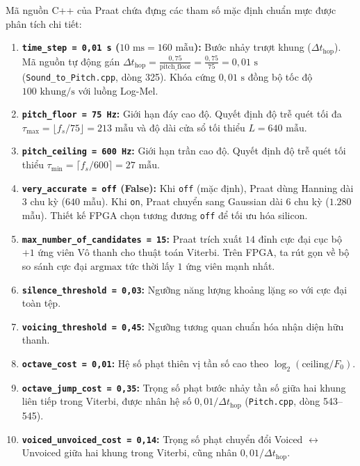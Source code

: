 \documentclass[11pt,a4paper]{article}
\begin{document}
Mã nguồn C++ của Praat chứa đựng các tham số mặc định chuẩn mực được phân tích chi tiết:
\begin{enumerate}
    \setlength{\itemsep}{1pt}
    \item \textbf{\texttt{time\_step = 0,01 s} ($10\text{ ms} = 160\text{ mẫu}$):} Bước nhảy trượt khung ($\Delta t_{\text{hop}}$). Mã nguồn tự động gán $\Delta t_{\text{hop}} = \frac{0{,}75}{\text{pitch\_floor}} = \frac{0{,}75}{75} = 0{,}01\text{ s}$ (\texttt{Sound\_to\_Pitch.cpp}, dòng 325). Khóa cứng $0{,}01\text{ s}$ đồng bộ tốc độ $100\text{ khung/s}$ với luồng Log-Mel.
    \item \textbf{\texttt{pitch\_floor = 75 Hz}:} Giới hạn đáy cao độ. Quyết định độ trễ quét tối đa $\tau_{\max} = \lfloor f_s / 75 \rfloor = 213\text{ mẫu}$ và độ dài cửa sổ tối thiểu $L = 640\text{ mẫu}$.
    \item \textbf{\texttt{pitch\_ceiling = 600 Hz}:} Giới hạn trần cao độ. Quyết định độ trễ quét tối thiểu $\tau_{\min} = \lceil f_s / 600 \rceil = 27\text{ mẫu}$.
    \item \textbf{\texttt{very\_accurate = off} (False):} Khi \texttt{off} (mặc định), Praat dùng Hanning dài 3 chu kỳ ($640$ mẫu). Khi \texttt{on}, Praat chuyển sang Gaussian dài 6 chu kỳ ($1.280$ mẫu). Thiết kế FPGA chọn tương đương \texttt{off} để tối ưu hóa silicon.
    \item \textbf{\texttt{max\_number\_of\_candidates = 15}:} Praat trích xuất $14$ đỉnh cực đại cục bộ $+ 1$ ứng viên Vô thanh cho thuật toán Viterbi. Trên FPGA, ta rút gọn về bộ so sánh cực đại $\text{argmax}$ tức thời lấy $1$ ứng viên mạnh nhất.
    \item \textbf{\texttt{silence\_threshold = 0,03}:} Ngưỡng năng lượng khoảng lặng so với cực đại toàn tệp.
    \item \textbf{\texttt{voicing\_threshold = 0,45}:} Ngưỡng tương quan chuẩn hóa nhận diện hữu thanh.
    \item \textbf{\texttt{octave\_cost = 0,01}:} Hệ số phạt thiên vị tần số cao theo $\log_2(\text{ceiling}/F_0)$.
    \item \textbf{\texttt{octave\_jump\_cost = 0,35}:} Trọng số phạt bước nhảy tần số giữa hai khung liên tiếp trong Viterbi, được nhân hệ số $0{,}01 / \Delta t_{\text{hop}}$ (\texttt{Pitch.cpp}, dòng 543--545).
    \item \textbf{\texttt{voiced\_unvoiced\_cost = 0,14}:} Trọng số phạt chuyển đổi Voiced $\leftrightarrow$ Unvoiced giữa hai khung trong Viterbi, cũng nhân $0{,}01 / \Delta t_{\text{hop}}$.
\end{enumerate}
\end{document}
